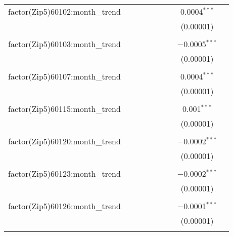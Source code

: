 \begin{table}[H]
{\begin{tabular}{@{\extracolsep{5pt}}lcccccccc}
  factor(Zip5)60102:month\_trend &  &  &  &  &  &  & 0.0004$^{***}$ &  \\  

   &  &  &  &  &  &  & (0.00001) &  \\  

   & & & & & & & & \\  

  factor(Zip5)60103:month\_trend &  &  &  &  &  &  & $-$0.0005$^{***}$ &  \\  

   &  &  &  &  &  &  & (0.00001) &  \\  

   & & & & & & & & \\  

  factor(Zip5)60107:month\_trend &  &  &  &  &  &  & 0.0004$^{***}$ &  \\  

   &  &  &  &  &  &  & (0.00001) &  \\  

   & & & & & & & & \\  

  factor(Zip5)60115:month\_trend &  &  &  &  &  &  & 0.001$^{***}$ &  \\  

   &  &  &  &  &  &  & (0.00001) &  \\  

   & & & & & & & & \\  

  factor(Zip5)60120:month\_trend &  &  &  &  &  &  & $-$0.0002$^{***}$ &  \\  

   &  &  &  &  &  &  & (0.00001) &  \\  

   & & & & & & & & \\  

  factor(Zip5)60123:month\_trend &  &  &  &  &  &  & $-$0.0002$^{***}$ &  \\  

   &  &  &  &  &  &  & (0.00001) &  \\  

   & & & & & & & & \\  

  factor(Zip5)60126:month\_trend &  &  &  &  &  &  & $-$0.0001$^{***}$ &  \\  

   &  &  &  &  &  &  & (0.00001) &  \\  

   & & & & & & & & \\  


\end{tabular}}
\end{table}
